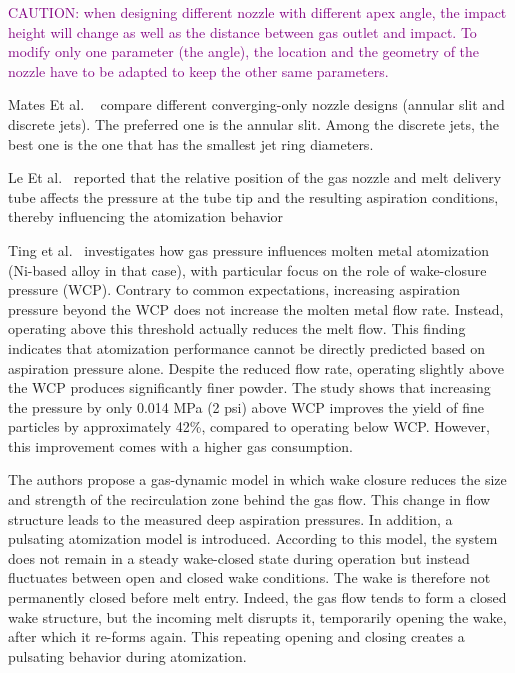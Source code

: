 \documentclass[../main]{subfiles}
\begin{document}

\textcolor{Purple}{CAUTION: when designing different nozzle with different apex angle, the impact height will change as well as the distance between gas outlet and impact. To modify only one parameter (the angle), the location and the geometry of the nozzle have to be adapted to keep the other same parameters.}

Mates Et al. ~\cite{Mates2000ComparisonSupersonic} compare different converging-only nozzle designs (annular slit and discrete jets). The preferred one  is the annular slit. Among the discrete jets, the best one is the one that has the smallest jet ring diameters.

Le Et al.~\cite{Le2026PDFAdditives} reported that the relative position of the gas nozzle and melt delivery tube affects the pressure at the tube tip and the resulting aspiration conditions, thereby influencing the atomization behavior

Ting et al.~\cite{Ting2002EffectWakeclosure} investigates how gas pressure influences molten metal atomization (Ni-based alloy in that case), with particular focus on the role of wake-closure pressure (WCP). Contrary to common expectations, increasing aspiration pressure beyond the WCP does not increase the molten metal flow rate. Instead, operating above this threshold actually reduces the melt flow. This finding indicates that atomization performance cannot be directly predicted based on aspiration pressure alone. Despite the reduced flow rate, operating slightly above the WCP produces significantly finer powder. The study shows that increasing the pressure by only 0.014 MPa (2 psi) above WCP improves the yield of fine particles by approximately 42\%, compared to operating below WCP. However, this improvement comes with a higher gas consumption.

The authors propose a gas-dynamic model in which wake closure reduces the size and strength of the recirculation zone behind the gas flow. This change in flow structure leads to the measured deep aspiration pressures. In addition, a pulsating atomization model is introduced. According to this model, the system does not remain in a steady wake-closed state during operation but instead fluctuates between open and closed wake conditions. The wake is therefore not permanently closed before melt entry. Indeed, the gas flow tends to form a closed wake structure, but the incoming melt disrupts it, temporarily opening the wake, after which it re-forms again. This repeating opening and closing creates a pulsating behavior during atomization.
\end{document}
